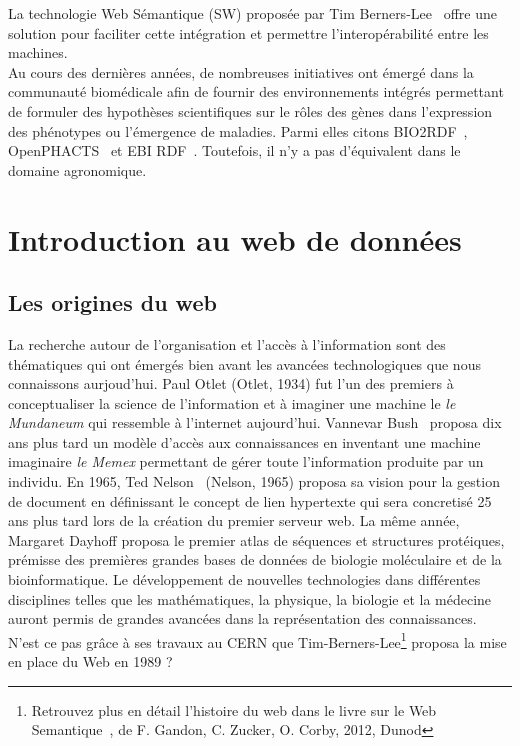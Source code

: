 La technologie Web Sémantique (SW) proposée par Tim Berners-Lee~\cite{berners2001semweb} offre une solution pour faciliter cette intégration et permettre l'interopérabilité entre les machines. \\

Au cours des dernières années, de nombreuses initiatives ont émergé dans la communauté biomédicale afin de fournir des environnements intégrés permettant de formuler des hypothèses scientifiques sur le rôles des gènes dans l’expression des phénotypes ou l’émergence de maladies. Parmi elles citons BIO2RDF~\cite{Belleau2008a}, OpenPHACTS~\cite{williams2012} et EBI RDF~\cite{Jupp2014}. Toutefois, il n’y a pas d’équivalent dans le domaine agronomique. \\




\section{Introduction au web de données}
\subsection{Les origines du web}

La recherche autour de l’organisation et l’accès à l’information sont des thématiques qui ont émergés bien avant les avancées technologiques que nous connaissons aurjoud'hui. Paul Otlet\cite{Otlet1934} (Otlet, 1934) fut l'un des premiers à conceptualiser la science de l'information et à imaginer une machine le \textit{ le Mundaneum} qui ressemble à l'internet aujourd'hui. Vannevar Bush~\cite{Vandenbussche2011} proposa dix ans plus tard un modèle d'accès aux connaissances en inventant une machine imaginaire  \textit{le Memex} permettant de gérer toute l'information produite par un individu. En 1965, Ted Nelson~\cite{Nelson1991} (Nelson, 1965) proposa sa vision pour la gestion de document en définissant le concept de lien hypertexte qui sera concretisé 25 ans plus tard lors de la création du premier serveur web. La même année, Margaret Dayhoff proposa le premier atlas de séquences et structures protéiques, prémisse des premières grandes bases de données de biologie moléculaire et de la bioinformatique. Le développement de nouvelles technologies dans différentes disciplines telles que les mathématiques, la physique, la biologie et la médecine auront permis de grandes avancées dans la représentation des connaissances. N'est ce pas grâce à ses travaux au CERN que Tim-Berners-Lee\footnote{Retrouvez plus en détail l'histoire du web dans le livre sur le Web Semantique~\cite{GandonFZuckerCorby2012}, de F. Gandon, C. Zucker, O. Corby, 2012, Dunod}  proposa la mise en place du Web en 1989 ? \\

